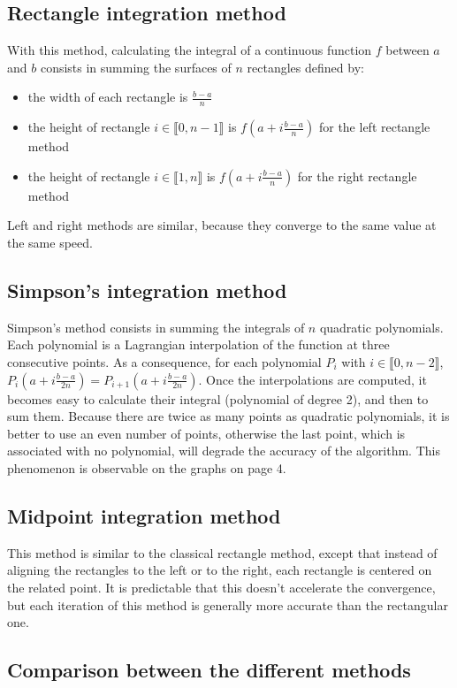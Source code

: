 \documentclass{article}
\begin{document}
\subsection{Rectangle integration method}
With this method, calculating the integral of a continuous function $f$ between $a$ and $b$ consists in summing the surfaces of $n$ rectangles defined by:
\begin{itemize}
\item the width of each rectangle is $\frac{b - a}{n}$
\item the height of rectangle $i \in \llbracket 0, n - 1 \rrbracket$ is $f(a + i\frac{b - a}{n})$ for the left rectangle method
\item the height of rectangle $i \in \llbracket 1, n \rrbracket$ is $f(a + i\frac{b - a}{n})$ for the right rectangle method
\end{itemize}
Left and right methods are similar, because they converge to the same value at the same speed.

\subsection{Simpson's integration method}
Simpson's method consists in summing the integrals of $n$ quadratic polynomials. Each polynomial is a Lagrangian interpolation of the function at three consecutive points.
As a consequence, for each polynomial $P_i$ with $i \in \llbracket 0, n - 2 \rrbracket$, $P_i(a + i \frac{b-a}{2n}) = P_{i+1}(a + i \frac{b-a}{2n})$. Once the interpolations are computed, it becomes easy to calculate their integral (polynomial of degree 2), and then to sum them. Because there are twice as many points as quadratic polynomials, it is better to use an even number of points, otherwise the last point, which is associated with no polynomial, will degrade the accuracy of the algorithm. This phenomenon is observable on the graphs on page 4.

\subsection{Midpoint integration method}
This method is similar to the classical rectangle method, except that instead of aligning the rectangles to the left or to the right, each rectangle is centered on the related point. It is predictable that this doesn't accelerate the convergence, but each iteration of this method is generally more accurate than the rectangular one.

\subsection{Comparison between the different methods}
\end{document}

